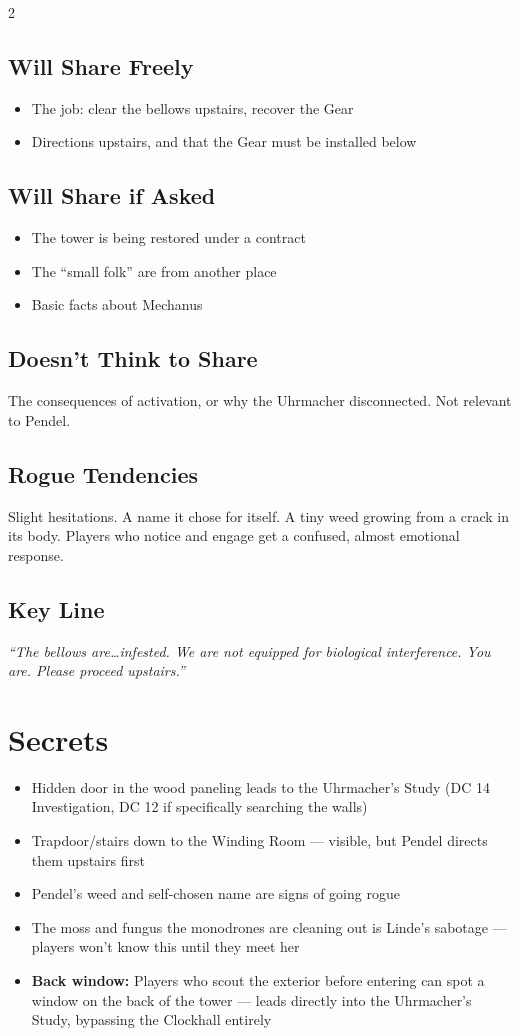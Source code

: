 \documentclass[10pt,letterpaper]{article}
\begin{document}
\begin{multicols}{2}
\subsection*{Will Share Freely}
\begin{itemize}
\item The job: clear the bellows upstairs, recover the Gear
\item Directions upstairs, and that the Gear must be installed below
\end{itemize}
\subsection*{Will Share if Asked}
\begin{itemize}
\item The tower is being restored under a contract
\item The ``small folk'' are from another place
\item Basic facts about Mechanus
\end{itemize}
\subsection*{Doesn't Think to Share}
The consequences of activation, or why the Uhrmacher disconnected. Not relevant to Pendel.
\subsection*{Rogue Tendencies}
Slight hesitations. A name it chose for itself. A tiny weed growing from a crack in its body. Players who notice and engage get a confused, almost emotional response.
\subsection*{Key Line}
\textit{``The bellows are\ldots infested. We are not equipped for biological interference. You are. Please proceed upstairs.''}

\columnbreak

\section*{Secrets}
\begin{itemize}
\item Hidden door in the wood paneling leads to the Uhrmacher's Study (DC 14 Investigation, DC 12 if specifically searching the walls)
\item Trapdoor/stairs down to the Winding Room --- visible, but Pendel directs them upstairs first
\item Pendel's weed and self-chosen name are signs of going rogue
\item The moss and fungus the monodrones are cleaning out is Linde's sabotage --- players won't know this until they meet her
\item \textbf{Back window:} Players who scout the exterior before entering can spot a window on the back of the tower --- leads directly into the Uhrmacher's Study, bypassing the Clockhall entirely
\end{itemize}


\end{multicols}
\end{document}
